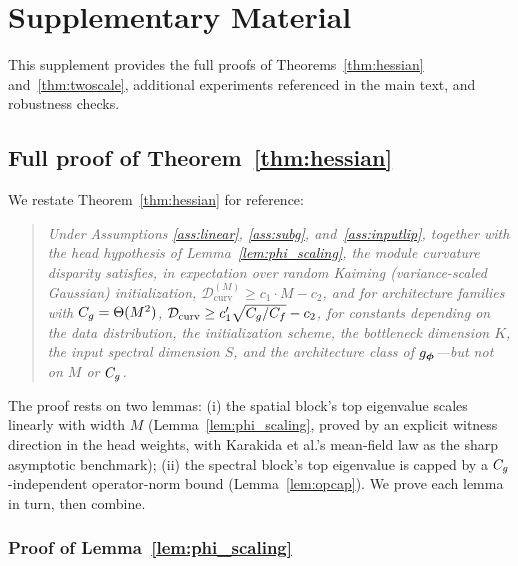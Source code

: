\section{Supplementary Material}
\label{sec:supplement}

This supplement provides the full proofs of Theorems~\ref{thm:hessian}
and~\ref{thm:twoscale}, additional experiments referenced in the main
text, and robustness checks.

\subsection{Full proof of Theorem~\ref{thm:hessian}}
\label{sec:proof_thm1}

We restate Theorem~\ref{thm:hessian} for reference:

\begin{quote}
\emph{Under Assumptions \ref{ass:linear}, \ref{ass:subg},
and~\ref{ass:inputlip}, together with the
head hypothesis of Lemma~\ref{lem:phi_scaling}, the module curvature
disparity satisfies, in expectation over random Kaiming
(variance-scaled Gaussian) initialization,
$\mathcal{D}_{\mathrm{curv}}^{(M)} \geq c_1 \cdot M - c_2$, and for
architecture families with $C_g = \Theta(M^2)$,
$\mathcal{D}_{\mathrm{curv}} \geq c_1' \sqrt{C_g/C_f} - c_2$, for
constants depending on the data distribution, the initialization
scheme, the bottleneck dimension $K$, the input spectral dimension
$S$, and the architecture class of $g_{\boldsymbol{\phi}}$---but not on $M$ or
$C_g$.}
\end{quote}

The proof rests on two lemmas: (i) the spatial block's top eigenvalue
scales linearly with width $M$ (Lemma~\ref{lem:phi_scaling}, proved
by an explicit witness direction in the head weights, with Karakida
et al.'s mean-field law as the sharp asymptotic benchmark); (ii) the
spectral block's top eigenvalue is capped by a $C_g$-independent
operator-norm bound (Lemma~\ref{lem:opcap}). We prove each lemma in
turn, then combine.

\subsubsection{Proof of Lemma~\ref{lem:phi_scaling}}

